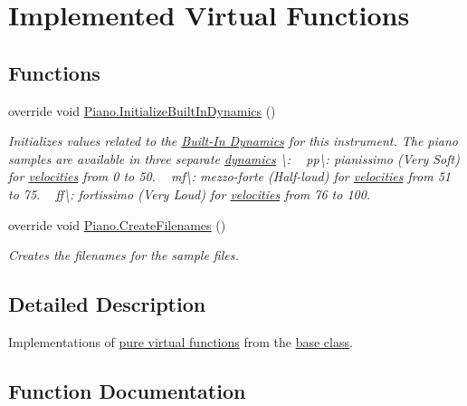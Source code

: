 \hypertarget{group___piano_virt}{}\section{Implemented Virtual Functions}
\label{group___piano_virt}
\subsection*{Functions}
\begin{DoxyCompactItemize}
\item 
override void \hyperlink{group___piano_virt_ga6bc02528f8808b8a30aa7d5776445a6d}{Piano.\+Initialize\+Built\+In\+Dynamics} ()
\begin{DoxyCompactList}\small\item\em Initializes values related to the \hyperlink{group___audio_DefBID}{Built-\/\+In Dynamics} for this instrument. The piano samples are available in three separate \hyperlink{group___audio_DefBID}{dynamics} \textbackslash{}\+: ~\newline
 pp\textbackslash{}\+: pianissimo (Very Soft) for \hyperlink{group___audio_DefVel}{velocities} from 0 to 50. ~\newline
 mf\textbackslash{}\+: mezzo-\/forte (Half-\/loud) for \hyperlink{group___audio_DefVel}{velocities} from 51 to 75. ~\newline
 ff\textbackslash{}\+: fortissimo (Very Loud) for \hyperlink{group___audio_DefVel}{velocities} from 76 to 100. \end{DoxyCompactList}\item 
override void \hyperlink{group___piano_virt_gaafd50f0f04ea7ea4f560accc628b8f1b}{Piano.\+Create\+Filenames} ()
\begin{DoxyCompactList}\small\item\em Creates the filenames for the sample files. \end{DoxyCompactList}\end{DoxyCompactItemize}


\subsection{Detailed Description}
Implementations of \hyperlink{group___v_i_base_virt_func}{pure virtual functions} from the \hyperlink{group___v_i_base}{base class}. 

\subsection{Function Documentation}
\mbox{\label{group___piano_virt_gaafd50f0f04ea7ea4f560accc628b8f1b}} 

